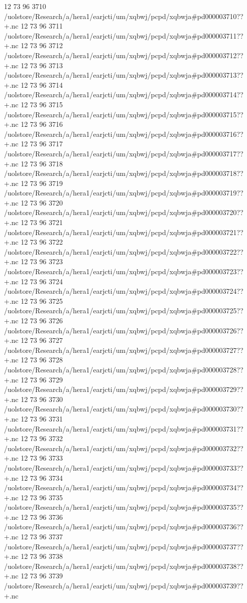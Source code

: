 12 73 96
3710
/uolstore/Research/a/hera1/earjcti/um/xqbwj/pcpd/xqbwja#pd000003710??+.nc
12 73 96
3711
/uolstore/Research/a/hera1/earjcti/um/xqbwj/pcpd/xqbwja#pd000003711??+.nc
12 73 96
3712
/uolstore/Research/a/hera1/earjcti/um/xqbwj/pcpd/xqbwja#pd000003712??+.nc
12 73 96
3713
/uolstore/Research/a/hera1/earjcti/um/xqbwj/pcpd/xqbwja#pd000003713??+.nc
12 73 96
3714
/uolstore/Research/a/hera1/earjcti/um/xqbwj/pcpd/xqbwja#pd000003714??+.nc
12 73 96
3715
/uolstore/Research/a/hera1/earjcti/um/xqbwj/pcpd/xqbwja#pd000003715??+.nc
12 73 96
3716
/uolstore/Research/a/hera1/earjcti/um/xqbwj/pcpd/xqbwja#pd000003716??+.nc
12 73 96
3717
/uolstore/Research/a/hera1/earjcti/um/xqbwj/pcpd/xqbwja#pd000003717??+.nc
12 73 96
3718
/uolstore/Research/a/hera1/earjcti/um/xqbwj/pcpd/xqbwja#pd000003718??+.nc
12 73 96
3719
/uolstore/Research/a/hera1/earjcti/um/xqbwj/pcpd/xqbwja#pd000003719??+.nc
12 73 96
3720
/uolstore/Research/a/hera1/earjcti/um/xqbwj/pcpd/xqbwja#pd000003720??+.nc
12 73 96
3721
/uolstore/Research/a/hera1/earjcti/um/xqbwj/pcpd/xqbwja#pd000003721??+.nc
12 73 96
3722
/uolstore/Research/a/hera1/earjcti/um/xqbwj/pcpd/xqbwja#pd000003722??+.nc
12 73 96
3723
/uolstore/Research/a/hera1/earjcti/um/xqbwj/pcpd/xqbwja#pd000003723??+.nc
12 73 96
3724
/uolstore/Research/a/hera1/earjcti/um/xqbwj/pcpd/xqbwja#pd000003724??+.nc
12 73 96
3725
/uolstore/Research/a/hera1/earjcti/um/xqbwj/pcpd/xqbwja#pd000003725??+.nc
12 73 96
3726
/uolstore/Research/a/hera1/earjcti/um/xqbwj/pcpd/xqbwja#pd000003726??+.nc
12 73 96
3727
/uolstore/Research/a/hera1/earjcti/um/xqbwj/pcpd/xqbwja#pd000003727??+.nc
12 73 96
3728
/uolstore/Research/a/hera1/earjcti/um/xqbwj/pcpd/xqbwja#pd000003728??+.nc
12 73 96
3729
/uolstore/Research/a/hera1/earjcti/um/xqbwj/pcpd/xqbwja#pd000003729??+.nc
12 73 96
3730
/uolstore/Research/a/hera1/earjcti/um/xqbwj/pcpd/xqbwja#pd000003730??+.nc
12 73 96
3731
/uolstore/Research/a/hera1/earjcti/um/xqbwj/pcpd/xqbwja#pd000003731??+.nc
12 73 96
3732
/uolstore/Research/a/hera1/earjcti/um/xqbwj/pcpd/xqbwja#pd000003732??+.nc
12 73 96
3733
/uolstore/Research/a/hera1/earjcti/um/xqbwj/pcpd/xqbwja#pd000003733??+.nc
12 73 96
3734
/uolstore/Research/a/hera1/earjcti/um/xqbwj/pcpd/xqbwja#pd000003734??+.nc
12 73 96
3735
/uolstore/Research/a/hera1/earjcti/um/xqbwj/pcpd/xqbwja#pd000003735??+.nc
12 73 96
3736
/uolstore/Research/a/hera1/earjcti/um/xqbwj/pcpd/xqbwja#pd000003736??+.nc
12 73 96
3737
/uolstore/Research/a/hera1/earjcti/um/xqbwj/pcpd/xqbwja#pd000003737??+.nc
12 73 96
3738
/uolstore/Research/a/hera1/earjcti/um/xqbwj/pcpd/xqbwja#pd000003738??+.nc
12 73 96
3739
/uolstore/Research/a/hera1/earjcti/um/xqbwj/pcpd/xqbwja#pd000003739??+.nc
